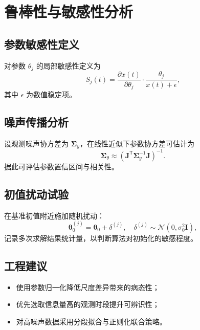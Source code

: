 \chapter{鲁棒性与敏感性分析}

\section{参数敏感性定义}
对参数 $\theta_j$ 的局部敏感性定义为
\[
S_j(t)=\frac{\partial x(t)}{\partial \theta_j}\cdot \frac{\theta_j}{x(t)+\epsilon},
\]
其中 $\epsilon$ 为数值稳定项。

\section{噪声传播分析}
设观测噪声协方差为 $\mathbf{\Sigma}_y$，在线性近似下参数协方差可估计为
\[
\mathbf{\Sigma}_\theta \approx \left(\mathbf{J}^\mathsf{T}\mathbf{\Sigma}_y^{-1}\mathbf{J}\right)^{-1}.
\]
据此可评估参数置信区间与相关性。

\section{初值扰动试验}
在基准初值附近施加随机扰动：
\[
\boldsymbol{\theta}_0^{(j)}=\boldsymbol{\theta}_0+\delta^{(j)},\quad \delta^{(j)}\sim \mathcal{N}(0,\sigma_0^2\mathbf{I}),
\]
记录多次求解结果统计量，以判断算法对初始化的敏感程度。

\section{工程建议}
\begin{itemize}
  \item 使用参数归一化降低尺度差异带来的病态性；
  \item 优先选取信息量高的观测时段提升可辨识性；
  \item 对高噪声数据采用分段拟合与正则化联合策略。
\end{itemize}
